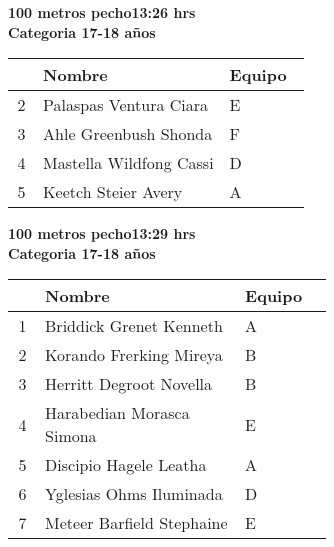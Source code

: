 \begin{minipage}{0.95\linewidth}\vspace{0.5cm} 
\begin{flushleft}
\textbf{
\hspace{-0.15cm}100 metros pecho\hspace{1.5cm}13:26 hrs \\Categoria 17-18 años}\vspace{-0.2cm} 
\end{flushleft}
\begin{tabular}{cp{0.63\linewidth}l}
\hline
& \textbf{Nombre} & \textbf{Equipo} \\ \hline
2 & Palaspas Ventura Ciara & E \\ 
3 & Ahle Greenbush Shonda & F \\ 
4 & Mastella Wildfong Cassi & D \\ 
5 & Keetch Steier Avery & A \\ 
\end{tabular}
\end{minipage}
\begin{minipage}{0.95\linewidth}\vspace{0.5cm} 
\begin{flushleft}
\textbf{
\hspace{-0.15cm}100 metros pecho\hspace{1.5cm}13:29 hrs \\Categoria 17-18 años}\vspace{-0.2cm} 
\end{flushleft}
\begin{tabular}{cp{0.63\linewidth}l}
\hline
& \textbf{Nombre} & \textbf{Equipo} \\ \hline
1 & Briddick Grenet Kenneth & A \\ 
2 & Korando Frerking Mireya & B \\ 
3 & Herritt Degroot Novella & B \\ 
4 & Harabedian Morasca Simona & E \\ 
5 & Discipio Hagele Leatha & A \\ 
6 & Yglesias Ohms Iluminada & D \\ 
7 & Meteer Barfield Stephaine & E \\ 
\end{tabular}
\end{minipage}
